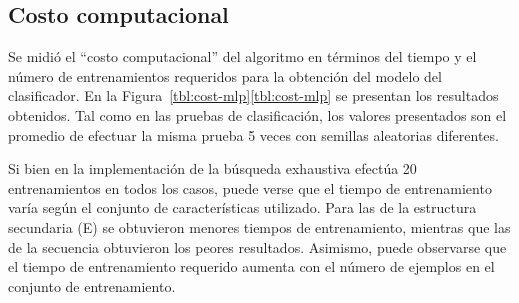 %
%
\subsection{Costo computacional}
%
Se midió el ``costo computacional'' del algoritmo en términos del
tiempo y el número de entrenamientos requeridos para la obtención del
modelo del clasificador.
En la \iflatexml{}Figura~\ref{tbl:cost-mlp}\else\autoref{tbl:cost-mlp}\fi{}
se presentan los resultados obtenidos. Tal como en las pruebas de
clasificación, los valores presentados son el promedio de efectuar la
misma prueba 5 veces con semillas aleatorias diferentes.

Si bien en la implementación de la búsqueda exhaustiva efectúa 20
entrenamientos en todos los casos, puede verse que el tiempo de
entrenamiento varía según el conjunto de características utilizado.
Para las  de la estructura secundaria (E) se obtuvieron
menores tiempos de entrenamiento, mientras que las de la secuencia
obtuvieron los peores resultados.
Asimismo, puede observarse que el tiempo de entrenamiento requerido
aumenta con el número de ejemplos en el conjunto de entrenamiento.
